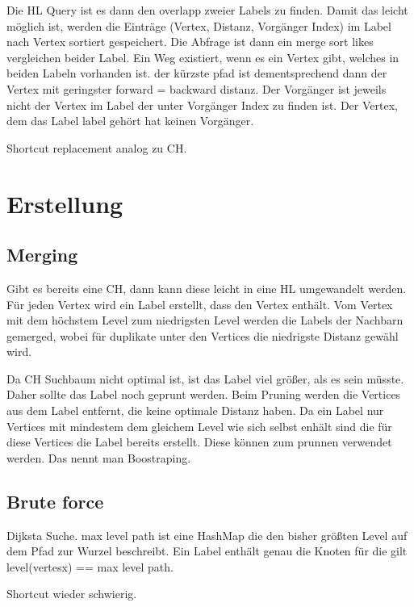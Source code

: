 Die HL Query ist es dann den overlapp zweier Labels zu finden.
Damit das leicht möglich ist, werden die Einträge (Vertex, Distanz, Vorgänger Index) im Label nach Vertex sortiert gespeichert.
Die Abfrage ist dann ein merge sort likes vergleichen beider Label. Ein Weg existiert, wenn es ein Vertex gibt, welches in beiden Labeln vorhanden ist.
der kürzste pfad ist dementsprechend dann der Vertex mit geringster forward = backward distanz.
Der Vorgänger ist jeweils nicht der Vertex im Label der unter Vorgänger Index zu finden ist. Der Vertex, dem das Label label gehört hat keinen Vorgänger.

Shortcut replacement analog zu CH.

\section{Erstellung}

\subsection{Merging}
Gibt es bereits eine CH, dann kann diese leicht in eine HL umgewandelt werden.
Für jeden Vertex wird ein Label erstellt, dass den Vertex enthält.
Vom Vertex mit dem höchstem Level zum niedrigsten Level werden die Labels der Nachbarn gemerged, wobei für duplikate unter den Vertices die niedrigste Distanz gewähl wird.

Da CH Suchbaum nicht optimal ist, ist das Label viel größer, als es sein müsste. Daher sollte das Label noch geprunt werden.
Beim Pruning werden die Vertices aus dem Label entfernt, die keine optimale Distanz haben.
Da ein Label nur Vertices mit mindestem dem gleichem Level wie sich selbst enhält sind die für diese Vertices die Label bereits erstellt.
Diese können zum prunnen verwendet werden.
Das nennt man Boostraping.

\subsection{Brute force}
Dijksta Suche.
max level path ist eine HashMap die den bisher größten Level auf dem Pfad zur Wurzel beschreibt.
Ein Label enthält genau die Knoten für die gilt level(vertesx) == max level path.

Shortcut wieder schwierig.
